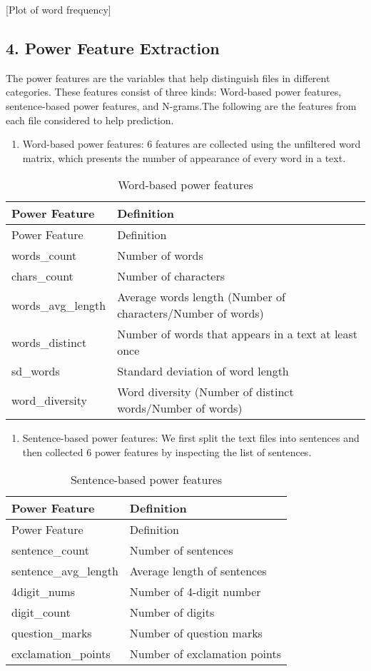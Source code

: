 \documentclass[12pt,]{article}
\begin{document}
{[}Plot of word frequency{]}

\subsection{{4. Power Feature
Extraction}}\label{power-feature-extraction}

The power features are the variables that help distinguish files in
different categories. These features consist of three kinds: Word-based
power features, sentence-based power features, and N-grams.The following
are the features from each file considered to help prediction.

\begin{enumerate}
\def\labelenumi{(\arabic{enumi})}
\itemsep1pt\parskip0pt
\item
  Word-based power features: 6 features are collected using the
  unfiltered word matrix, which presents the number of appearance of
  every word in a text.
\end{enumerate}

\begin{longtable}[c]{@{}ll@{}}
\caption{Word-based power features}\tabularnewline
\toprule
Power Feature & Definition\tabularnewline
\midrule
\endfirsthead
\toprule
Power Feature & Definition\tabularnewline
\midrule
\endhead
words\_count & Number of words\tabularnewline
chars\_count & Number of characters\tabularnewline
words\_avg\_length & Average words length (Number of characters/Number
of words)\tabularnewline
words\_distinct & Number of words that appears in a text at least
once\tabularnewline
sd\_words & Standard deviation of word length\tabularnewline
word\_diversity & Word diversity (Number of distinct words/Number of
words)\tabularnewline
\bottomrule
\end{longtable}

\begin{enumerate}
\def\labelenumi{(\arabic{enumi})}
\setcounter{enumi}{1}
\itemsep1pt\parskip0pt
\item
  Sentence-based power features: We first split the text files into
  sentences and then collected 6 power features by inspecting the list
  of sentences.
\end{enumerate}

\begin{longtable}[c]{@{}ll@{}}
\caption{Sentence-based power features}\tabularnewline
\toprule
Power Feature & Definition\tabularnewline
\midrule
\endfirsthead
\toprule
Power Feature & Definition\tabularnewline
\midrule
\endhead
sentence\_count & Number of sentences\tabularnewline
sentence\_avg\_length & Average length of sentences\tabularnewline
4digit\_nums & Number of 4-digit number\tabularnewline
digit\_count & Number of digits\tabularnewline
question\_marks & Number of question marks\tabularnewline
exclamation\_points & Number of exclamation points\tabularnewline
\bottomrule
\end{longtable}
\end{document}
